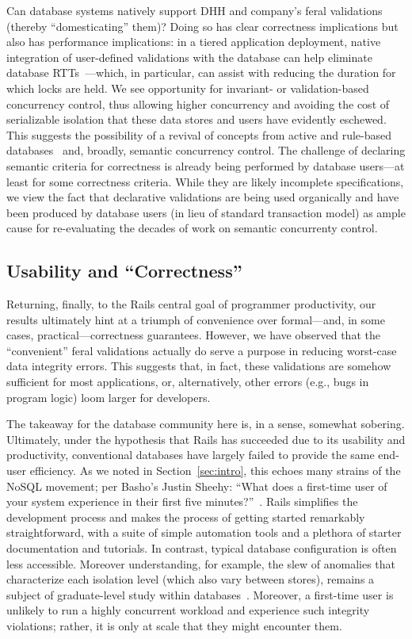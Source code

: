 Can database systems natively support DHH and company's feral
validations (thereby ``domesticating'' them)?  Doing so has clear
correctness implications but also has performance implications: in a
tiered application deployment, native integration of user-defined
validations with the database can help eliminate database
RTTs~\cite{pyxis}---which, in particular, can assist with reducing the
duration for which locks are held. We see opportunity for invariant-
or validation-based concurrency control, thus allowing higher
concurrency and avoiding the cost of serializable isolation that these
data stores and users have evidently eschewed. This suggests the
possibility of a revival of concepts from active and rule-based
databases~\cite{activedb-book} and, broadly, semantic concurrency
control. The challenge of declaring semantic criteria for correctness
is already being performed by database users---at least for some
correctness criteria. While they are likely incomplete specifications,
we view the fact that declarative validations are being used
organically and have been produced by database users (in lieu of
standard transaction model) as ample cause for re-evaluating the
decades of work on semantic concurrenty control.


\subsection{Usability and ``Correctness''}

Returning, finally, to the Rails central goal of programmer
productivity, our results ultimately hint at a triumph of convenience
over formal---and, in some cases, practical---correctness
guarantees. However, we have observed that the ``convenient'' feral
validations actually do serve a purpose in reducing worst-case data
integrity errors. This suggests that, in fact, these validations are
somehow sufficient for most applications, or, alternatively, other
errors (e.g., bugs in program logic) loom larger for developers.

The takeaway for the database community here is, in a sense, somewhat
sobering. Ultimately, under the hypothesis that Rails has succeeded
due to its usability and productivity, conventional databases have
largely failed to provide the same end-user efficiency. As we noted in
Section~\ref{sec:intro}, this echoes many strains of the NoSQL
movement; per Basho's Justin Sheehy: ``What does a first-time user of
your system experience in their first five
minutes?''~\cite{marcus-talk}. Rails simplifies the development
process and makes the process of getting started remarkably
straightforward, with a suite of simple automation tools and a
plethora of starter documentation and tutorials. In contrast, typical
database configuration is often less accessible. Moreover
understanding, for example, the slew of anomalies that characterize
each isolation level (which also vary between stores), remains a
subject of graduate-level study within
databases~\cite{adya-isolation,hat-vldb}. Moreover, a first-time user
is unlikely to run a highly concurrent workload and experience such
integrity violations; rather, it is only at scale that they might
encounter them.

